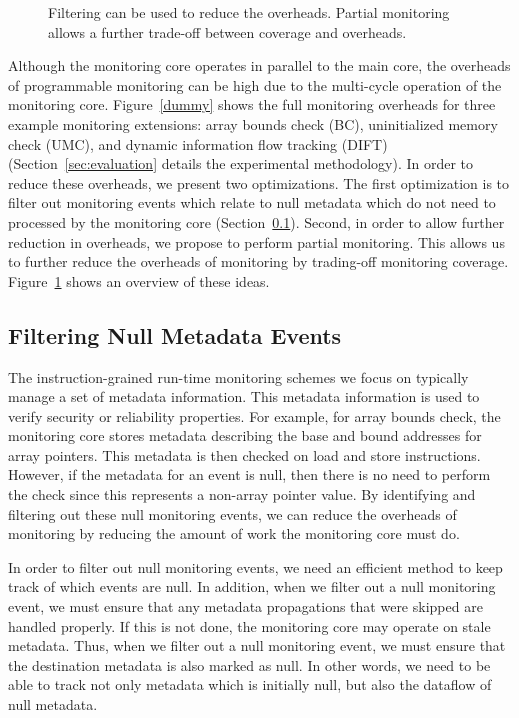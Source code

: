 \begin{figure}
\begin{center}
    \vspace{-0.2in}
    \caption{Filtering can be used to reduce the overheads. Partial monitoring
    allows a further trade-off between coverage and overheads.}
    \label{fig:optimizations.overview}
    \vspace{-0.1in}
  \end{center}
\end{figure}

Although the monitoring core operates in parallel to the main core, the
overheads of programmable monitoring can be high due to the multi-cycle
operation of the monitoring core.
Figure~\ref{dummy} shows the full
monitoring overheads for three example monitoring extensions: array bounds
check (BC), uninitialized memory check (UMC), and dynamic information flow
tracking (DIFT) (Section~\ref{sec:evaluation} details the experimental methodology). In order to reduce these overheads, we present two
optimizations. The first optimization is to filter out monitoring events which relate to
null metadata which do not need to processed by the monitoring core (Section~\ref{sec:optimizations.filter}). Second, in order to allow
further reduction in overheads, we propose to perform partial monitoring. This
allows us to further reduce the overheads of monitoring by trading-off
monitoring coverage. Figure~\ref{fig:optimizations.overview} shows an overview
of
these ideas.

\subsection{Filtering Null Metadata Events}
\label{sec:optimizations.filter}

The instruction-grained run-time monitoring schemes we focus on typically
manage a set of metadata information. This metadata information is used to
verify security or reliability properties. For example, for array bounds
check, the monitoring core stores metadata describing the base and bound
addresses for array pointers. This metadata is then checked on load and store
instructions. However, if the metadata for an event is null, then there is no
need to perform the check since this represents a non-array pointer value. By
identifying and filtering out these null monitoring events, we can reduce the
overheads of
monitoring by reducing the amount of work the monitoring core must do.

In order to filter out null monitoring events, we need an efficient method to
keep track of which events are null. In addition, when we filter out a null
monitoring event, we must ensure that any metadata propagations that were
skipped are handled properly. If this is not done, the monitoring core may
operate on stale metadata. Thus, when we filter out a null monitoring event,
we must ensure that the destination metadata is also marked as null. 
In other words, we need to be able to track not only
metadata which is initially null, but also the dataflow of null metadata. 

